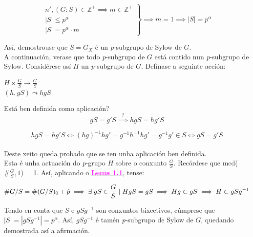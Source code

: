 \documentclass[twoside]{report}
\newcommand{\magbf}[1]{\textcolor{magenta}{\textbf{#1}}} %
\theoremstyle{mystyle}
\begin{document}
    \[ 
    \left. \begin{array}{r} 
    n', (G:S) \in \mathbb{Z}^{+} \implies m \in \mathbb{Z}^{+} \\[1ex]
    |S| \leq p^{\alpha} \\[1ex]
    |S| = p^{\alpha} \cdot m
    \end{array} \right\} 
    \implies m = 1 \implies |S| = p^{\alpha}
    \]

\noindent Así, demostrouse que $S = G_{X}$ é un \textit{p}-subgrupo de Sylow de $G$.\\

\noindent A continuación, verase que todo \textit{p}-subgrupo de $G$ está contido nun \textit{p}-subgrupo de Sylow. Considérese así $H$ un \textit{p}-subgrupo de $G$. Defínase a seguinte acción:

    \begin{center}
    $H \times \displaystyle \frac{G}{S} \longrightarrow \displaystyle \frac{G}{S}$ \\
    \vspace{2mm}
    \hspace{1mm} $(h,gS) \leadsto hgS$
    \end{center}  

\noindent Está ben definida como aplicación?
$$gS = g'S \overset{?}{\implies} hgS = hg'S$$

$$hgS = hg'S \Longleftrightarrow (hg)^{-1}hg' = g^{-1}h^{-1}hg' = g^{-1}g' \in S \Longleftrightarrow gS = g'S$$\\

\noindent Deste xeito queda probado que se ten unha aplicación ben definida.\\

\noindent Esta é unha actuación do \textit{p}-grupo $H$ sobre o  conxunto $\displaystyle \frac{G}{S}$. Recórdese que mcd($\# \displaystyle \frac{G}{S}, 1$) = 1. Así, aplicando o \hyperref[lem1.1]{\magbf{Lema 1.1}}, tense:

$$\# G/S = \# (G/S)_{0} + \dot{p} \implies \exists \hspace{1mm} gS \in \displaystyle \frac{G}{S} \hspace{1mm} | \hspace{1mm} HgS = gS \implies Hg \subset gS \implies H \subset gSg^{-1}$$

\noindent Tendo en conta que $S$ e $gSg^{-1}$ son conxuntos bixectivos, cúmprese que $|S| = |gSg^{-1}| = p^{\alpha}$. Así, $gSg^{-1}$ é tamén \textit{p}-subgrupo de Sylow de $G$, quedando demostrada así a afirmación.\\
\end{document}
